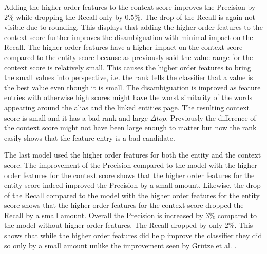 Adding the higher order features to the context score improves the Precision by $2\%$ while dropping the Recall only by $0.5\%$. The drop of the Recall is again not visible due to rounding. This displays that adding the higher order features to the context score further improves the disambiguation with minimal impact on the Recall. The higher order features have a higher impact on the context score compared to the entity score because as previously said the value range for the context score is relatively small. This causes the higher order features to bring the small values into perspective, i.e. the rank tells the classifier that a value is the best value even though it is small. The disambiguation is improved as feature entries with otherwise high scores might have the worst similarity of the words appearing around the alias and the linked entities page. The resulting context score is small and it has a bad rank and large $\Delta top$. Previously the difference of the context score might not have been large enough to matter but now the rank easily shows that the feature entry is a bad candidate.\par
The last model used the higher order features for both the entity and the context score. The improvement of the Precision compared to the model with the higher order features for the context score shows that the higher order features for the entity score indeed improved the Precision by a small amount. Likewise, the drop of the Recall compared to the model with the higher order features for the entity score shows that the higher order features for the context score dropped the Recall by a small amount. Overall the Precision is increased by $3\%$ compared to the model without higher order features. The Recall dropped by only $2\%$. This shows that while the higher order features did help improve the classifier they did so only by a small amount unlike the improvement seen by Grütze et al. \cite{coheel}.\par
